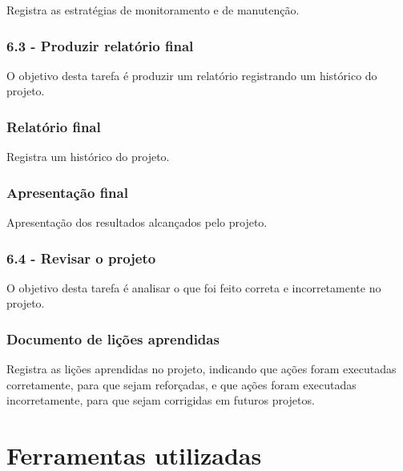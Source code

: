 Registra as estratégias de monitoramento e de manutenção.

\subsubsection*{\textbf{6.3 - Produzir relatório final}}

O objetivo desta tarefa é produzir um relatório registrando um histórico do projeto.

\subsubsection*{Relatório final}

Registra um histórico do projeto.

\subsubsection*{Apresentação final}

Apresentação dos resultados alcançados pelo projeto.

\subsubsection*{\textbf{6.4 - Revisar o projeto}}

O objetivo desta tarefa é analisar o que foi feito correta e incorretamente no projeto.

\subsubsection*{Documento de lições aprendidas}

Registra as lições aprendidas no projeto, indicando que ações foram executadas corretamente, para que sejam reforçadas, e que ações foram executadas incorretamente, para que sejam corrigidas em futuros projetos.

\section{Ferramentas utilizadas}